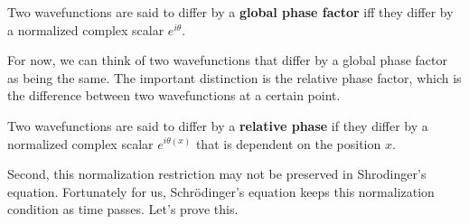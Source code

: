 \documentclass{article}
\begin{document}
    \begin{definition}
      \label{def:global-phase-factor}
      Two wavefunctions are said to differ by a \textbf{global phase factor} iff they differ by a normalized complex scalar $e^{i \theta}$.  
    \end{definition}

    For now, we can think of two wavefunctions that differ by a global phase factor as being the same. The important distinction is the relative phase factor, which is the difference between two wavefunctions at a certain point. 

    \begin{definition}
      \label{def:relative-phase}
      Two wavefunctions are said to differ by a \textbf{relative phase} if they differ by a normalized complex scalar $e^{i \theta(x)}$ that is dependent on the position $x$.
    \end{definition}

    Second, this normalization restriction may not be preserved in Shrodinger's equation. Fortunately for us, Schr\"odinger's equation keeps this normalization condition as time passes. Let's prove this. 
\end{document}
